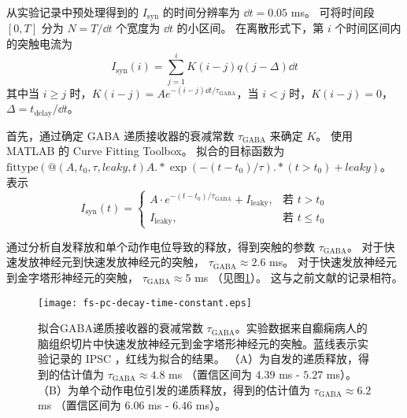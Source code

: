 从实验记录中预处理得到的 $I_\text{syn}$ 的时间分辨率为 $\dd{t} = 0.05$ ms。
可将时间段 $[0, T]$ 分为 $N = T/\dd{t}$ 个宽度为 $\dd{t}$ 的小区间。
在离散形式下，第 $i$ 个时间区间内的突触电流为
\begin{equation}
I_\text{syn}(i) = \sum_{j=1}^i K(i-j)q(j-\Delta)\dd{t}
\label{equation:synaptic-current-discrete-convolution} 
\end{equation}
其中当 $i \geq j$ 时，$K(i-j) = Ae^{-(i-j)\dd{t}/\tau_\text{GABA}}$，当 $i < j$ 时，$K(i-j) = 0$，$\Delta = t_\text{delay}/\dd{t}$。

首先，通过确定 GABA 递质接收器的衰减常数 $\tau_\text{GABA}$ 来确定 $K$。
使用 MATLAB 的 Curve Fitting Toolbox。
拟合的目标函数为 $\text{fittype}(@(A, t_0, \tau, leaky, t) A .* \exp(-(t-t_0)/\tau) .* (t > t_0) + leaky)$。
表示
\begin{equation}
I_\text{syn}(t) = 
\begin{cases}
A \cdot e^{-(t-t_0)/\tau_\text{GABA}} + I_\text{leaky}, & \text{若 } t > t_0 \\
I_\text{leaky}, & \text{若 } t \leq t_0
\end{cases}
\end{equation}

通过分析自发释放和单个动作电位导致的释放，得到突触的参数 $\tau_\text{GABA}$。
对于快速发放神经元到快速发放神经元的突触， $\tau_\text{GABA} \approx 2.6$ ms。
对于快速发放神经元到金字塔形神经元的突触， $\tau_\text{GABA} \approx 5$ ms （见图\ref{figure:decay-time-constant}）。
这与之前文献的记录相符\cite{Bartos2002}。

\begin{figure}
\centering
\texttt{[image: fs-pc-decay-time-constant.eps]}
\caption{拟合GABA递质接收器的衰减常数 $\tau_\text{GABA}$。实验数据来自癫痫病人的脑组织切片中快速发放神经元到金字塔形神经元的突触。蓝线表示实验记录的 IPSC ，红线为拟合的结果。
（A）为自发的递质释放，得到的估计值为 $\tau_\text{GABA} \approx 4.8$ ms （置信区间为 $4.39$ ms - $5.27$ ms）。
（B）为单个动作电位引发的递质释放，得到的估计值为 $\tau_\text{GABA} \approx 6.2$ ms （置信区间为 $6.06$ ms - $6.46$ ms）。}
\label{figure:decay-time-constant}
\end{figure}



